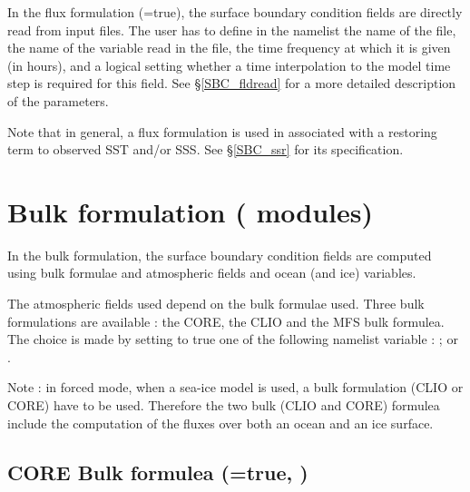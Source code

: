 \documentclass[NEMO_book]{subfiles}
\begin{document}
In the flux formulation (=true), the surface boundary 
condition fields are directly read from input files. The user has to define 
in the namelist  the name of the file, the name of the variable 
read in the file, the time frequency at which it is given (in hours), and a logical 
setting whether a time interpolation to the model time step is required 
for this field. See \S\ref{SBC_fldread} for a more detailed description of the parameters.

Note that in general, a flux formulation is used in associated with a 
restoring term to observed SST and/or SSS. See \S\ref{SBC_ssr} for its 
specification.


\section  [Bulk formulation (\textit{sbcblk\_core}, \textit{sbcblk\_clio} or \textit{sbcblk\_mfs}) ]
		{Bulk formulation \small{(   modules)} }
\label{SBC_blk}

In the bulk formulation, the surface boundary condition fields are computed 
using bulk formulae and atmospheric fields and ocean (and ice) variables. 

The atmospheric fields used depend on the bulk formulae used. Three bulk formulations 
are available : the CORE, the CLIO and the MFS bulk formulea. The choice is made by setting to true
one of the following namelist variable :  ;  or  .

Note : in forced mode, when a sea-ice model is used, a bulk formulation (CLIO or CORE) have to be used. 
Therefore the two bulk (CLIO and CORE) formulea include the computation of the fluxes over both 
an ocean and an ice surface. 

\subsection    [CORE Bulk formulea (\np{ln\_core}=true)]
		      {CORE Bulk formulea (=true, )}
\label{SBC_blk_core}
\end{document}
